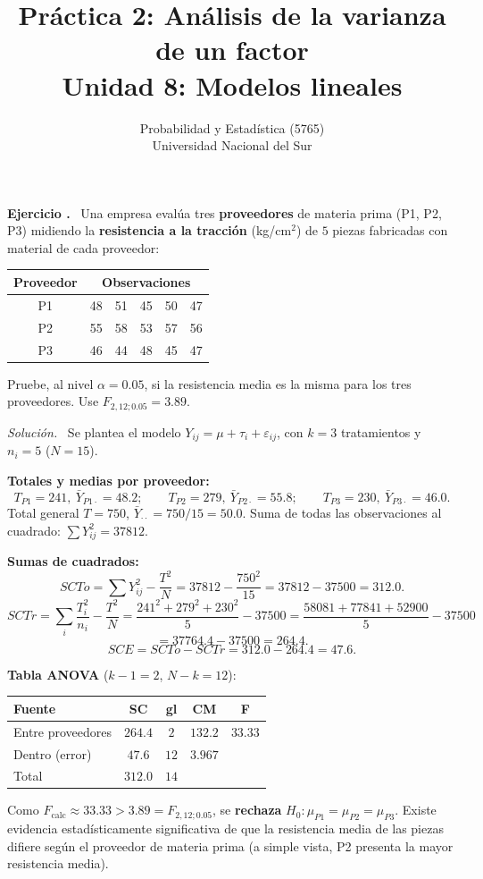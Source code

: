 \documentclass[11pt,a4paper]{article}
\title{Práctica 2: Análisis de la varianza de un factor \\ \large Unidad 8: Modelos lineales}
\author{Probabilidad y Estadística (5765) \\ Universidad Nacional del Sur}
\date{}
\newcounter{ejnum}
\newenvironment{ejercicio}{\refstepcounter{ejnum}\par\medskip\noindent\textbf{Ejercicio \theejnum.}~}{\par}
\newenvironment{solucion}{\par\noindent\textit{Solución.}~}{\par\vspace{1em}}
\begin{document}
\maketitle

\begin{ejercicio}
Una empresa evalúa tres \textbf{proveedores} de materia prima (P1, P2, P3) midiendo la \textbf{resistencia a la tracción} (kg/cm$^2$) de $5$ piezas fabricadas con material de cada proveedor:

\begin{table}[htbp]
\centering
\begin{tabular}{c|ccccc}
\toprule
Proveedor & \multicolumn{5}{c}{Observaciones} \\
\midrule
P1 & 48 & 51 & 45 & 50 & 47 \\
P2 & 55 & 58 & 53 & 57 & 56 \\
P3 & 46 & 44 & 48 & 45 & 47 \\
\bottomrule
\end{tabular}
\end{table}

Pruebe, al nivel $\alpha=0.05$, si la resistencia media es la misma para los tres proveedores. Use $F_{2,12;0.05}=3.89$.
\end{ejercicio}

\begin{solucion}
Se plantea el modelo $Y_{ij}=\mu+\tau_i+\varepsilon_{ij}$, con $k=3$ tratamientos y $n_i=5$ ($N=15$).

\textbf{Totales y medias por proveedor:}
\[
T_{P1}=241,\ \bar Y_{P1\cdot}=48.2; \qquad T_{P2}=279,\ \bar Y_{P2\cdot}=55.8; \qquad T_{P3}=230,\ \bar Y_{P3\cdot}=46.0.
\]
Total general $T=750$, $\bar Y_{\cdot\cdot}=750/15=50.0$. Suma de todas las observaciones al cuadrado: $\sum Y_{ij}^2=37812$.

\textbf{Sumas de cuadrados:}
\[
SCTo=\sum Y_{ij}^2-\frac{T^2}{N}=37812-\frac{750^2}{15}=37812-37500=312.0.
\]
\[
SCTr=\sum_i\frac{T_i^2}{n_i}-\frac{T^2}{N}=\frac{241^2+279^2+230^2}{5}-37500=\frac{58081+77841+52900}{5}-37500
\]
\[
=37764.4-37500=264.4.
\]
\[
SCE=SCTo-SCTr=312.0-264.4=47.6.
\]

\textbf{Tabla ANOVA} ($k-1=2$, $N-k=12$):
\begin{table}[htbp]
\centering
\begin{tabular}{lcccc}
\toprule
Fuente & SC & gl & CM & F \\
\midrule
Entre proveedores & $264.4$ & $2$ & $132.2$ & $33.33$ \\
Dentro (error) & $47.6$ & $12$ & $3.967$ & \\
\midrule
Total & $312.0$ & $14$ & & \\
\bottomrule
\end{tabular}
\end{table}

Como $F_{\text{calc}}\approx33.33 > 3.89=F_{2,12;0.05}$, se \textbf{rechaza} $H_0:\mu_{P1}=\mu_{P2}=\mu_{P3}$. Existe evidencia estadísticamente significativa de que la resistencia media de las piezas difiere según el proveedor de materia prima (a simple vista, P2 presenta la mayor resistencia media).
\end{solucion}
\end{document}
